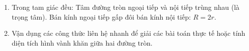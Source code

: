 \begin{enumerate}
\item Trong tam giác đều: Tâm đường tròn ngoại tiếp và nội tiếp trùng nhau (là trọng tâm). Bán kính ngoại tiếp gấp đôi bán kính nội tiếp: $\boxed{R = 2r}$.
\item Vận dụng các công thức liên hệ nhanh để giải các bài toán thực tế hoặc tính diện tích hình vành khăn giữa hai đường tròn.
\end{enumerate}
